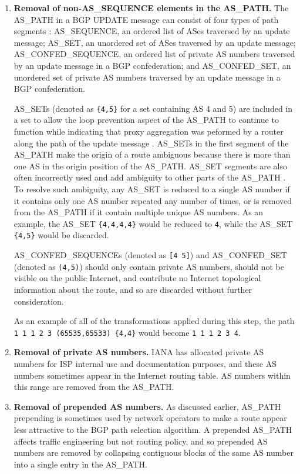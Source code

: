 \begin{enumerate}
\item{\textbf{Removal of non-AS\_SEQUENCE elements in the AS\_PATH.} The AS\_PATH in a BGP UPDATE message can consist of four types of path segments \cite{rfc5065}: AS\_SEQUENCE, an ordered list of ASes traversed by an update message; AS\_SET, an unordered set of ASes traversed by an update message; AS\_CONFED\_SEQUENCE, an ordered list of private AS numbers traversed by an update message in a BGP confederation; and AS\_CONFED\_SET, an unordered set of private AS numbers traversed by an update message in a BGP confederation.

AS\_SETs (denoted as \verb!{4,5}! for a set containing AS 4 and 5) are included in a set to allow the loop prevention aspect of the AS\_PATH to continue to function while indicating that proxy aggregation was peformed by a router along the path of the update message \cite{draft-deprecate-as-sets-04}. AS\_SETs in the first segment of the AS\_PATH make the origin of a route ambiguous because there is more than one AS in the origin position of the AS\_PATH. AS\_SET segments are also often incorrectly used and add ambiguity to other parts of the AS\_PATH \cite{draft-deprecate-as-sets-04}. To resolve such ambiguity, any AS\_SET is reduced to a single AS number if it contains only one AS number repeated any number of times, or is removed from the AS\_PATH if it contain multiple unique AS numbers. As an example, the AS\_SET \verb!{4,4,4,4}! would be reduced to \verb!4!, while the AS\_SET \verb!{4,5}! would be discarded.

AS\_CONFED\_SEQUENCEs (denoted as \verb![4 5]!) and AS\_CONFED\_SET (denoted as \verb!(4,5)!) should only contain private AS numbers, should not be visible on the public Internet, and contribute no Internet topological information about the route, and so are discarded without further consideration.

As an example of all of the transformations applied during this step, the path \\
\verb!1 1 1 2 3 (65535,65533) {4,4}! would become \verb!1 1 1 2 3 4!.
}

\item{\textbf{Removal of private AS numbers.} IANA has allocated private AS numbers \cite{rfc1930,rfc5398} for ISP internal use and documentation purposes, and these AS numbers sometimes appear in the Internet routing table. AS numbers within this range are removed from the AS\_PATH.}

\item{\textbf{Removal of prepended AS numbers.} As discussed earlier, AS\_PATH prepending is sometimes used by network operators to make a route appear less attractive to the BGP path selection algorithm. A prepended AS\_PATH affects traffic engineering but not routing policy, and so prepended AS numbers are removed by collapsing contiguous blocks of the same AS number into a single entry in the AS\_PATH.

}
\end{enumerate}
